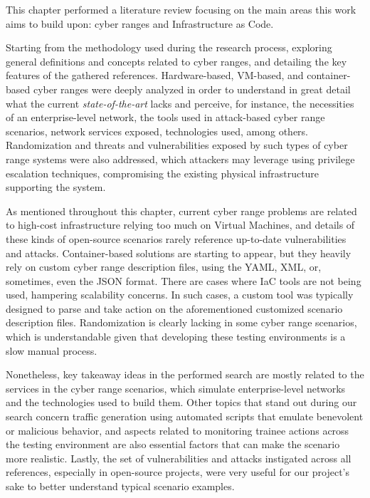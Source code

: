 This chapter performed a literature review focusing on the main areas this work aims to build upon: cyber ranges and Infrastructure as Code. 

Starting from the methodology used during the research process, exploring general definitions and concepts related to cyber ranges, and detailing the key features of the gathered references. Hardware-based, VM-based, and container-based cyber ranges were deeply analyzed in order to understand in great detail what the current \textit{state-of-the-art} lacks and perceive, for instance, the necessities of an enterprise-level network, the tools used in attack-based cyber range scenarios, network services exposed, technologies used, among others. Randomization and threats and vulnerabilities exposed by such types of cyber range systems were also addressed, which attackers may leverage using privilege escalation techniques, compromising the existing physical infrastructure supporting the system. 

As mentioned throughout this chapter, current cyber range problems are related to high-cost infrastructure relying too much on Virtual Machines, and details of these kinds of open-source scenarios rarely reference up-to-date vulnerabilities and attacks. Container-based solutions are starting to appear, but they heavily rely on custom cyber range description files, using the YAML, XML, or, sometimes, even the JSON format. There are cases where IaC tools are not being used, hampering scalability concerns. In such cases, a custom tool was typically designed to parse and take action on the aforementioned customized scenario description files. Randomization is clearly lacking in some cyber range scenarios, which is understandable given that developing these testing environments is a slow manual process.

Nonetheless, key takeaway ideas in the performed search are mostly related to the services in the cyber range scenarios, which simulate enterprise-level networks and the technologies used to build them. Other topics that stand out during our search concern traffic generation using automated scripts that emulate benevolent or malicious behavior, and aspects related to monitoring trainee actions across the testing environment are also essential factors that can make the scenario more realistic. Lastly, the set of vulnerabilities and attacks instigated across all references, especially in open-source projects, were very useful for our project's sake to better understand typical scenario examples.

